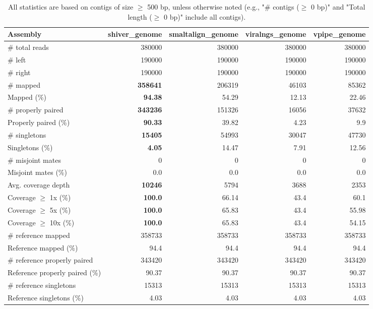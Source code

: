 \documentclass[12pt,a4paper]{article}
\begin{document}
\begin{table}[ht]
\begin{center}
\caption{All statistics are based on contigs of size $\geq$ 500 bp, unless otherwise noted (e.g., "\# contigs ($\geq$ 0 bp)" and "Total length ($\geq$ 0 bp)" include all contigs).}
\begin{tabular}{|l*{4}{|r}|}
\hline
Assembly & shiver\_genome & smaltalign\_genome & viralngs\_genome & vpipe\_genome \\ \hline
\# total reads & 380000 & 380000 & 380000 & 380000 \\ \hline
\# left & 190000 & 190000 & 190000 & 190000 \\ \hline
\# right & 190000 & 190000 & 190000 & 190000 \\ \hline
\# mapped & {\bf 358641} & 206319 & 46103 & 85362 \\ \hline
Mapped (\%) & {\bf 94.38} & 54.29 & 12.13 & 22.46 \\ \hline
\# properly paired & {\bf 343236} & 151326 & 16056 & 37632 \\ \hline
Properly paired (\%) & {\bf 90.33} & 39.82 & 4.23 & 9.9 \\ \hline
\# singletons & {\bf 15405} & 54993 & 30047 & 47730 \\ \hline
Singletons (\%) & {\bf 4.05} & 14.47 & 7.91 & 12.56 \\ \hline
\# misjoint mates & 0 & 0 & 0 & 0 \\ \hline
Misjoint mates (\%) & 0.0 & 0.0 & 0.0 & 0.0 \\ \hline
Avg. coverage depth & {\bf 10246} & 5794 & 3688 & 2353 \\ \hline
Coverage $\geq$ 1x (\%) & {\bf 100.0} & 66.14 & 43.4 & 60.1 \\ \hline
Coverage $\geq$ 5x (\%) & {\bf 100.0} & 65.83 & 43.4 & 55.98 \\ \hline
Coverage $\geq$ 10x (\%) & {\bf 100.0} & 65.83 & 43.4 & 54.15 \\ \hline
\# reference mapped & 358733 & 358733 & 358733 & 358733 \\ \hline
Reference mapped (\%) & 94.4 & 94.4 & 94.4 & 94.4 \\ \hline
\# reference properly paired & 343420 & 343420 & 343420 & 343420 \\ \hline
Reference properly paired (\%) & 90.37 & 90.37 & 90.37 & 90.37 \\ \hline
\# reference singletons & 15313 & 15313 & 15313 & 15313 \\ \hline
Reference singletons (\%) & 4.03 & 4.03 & 4.03 & 4.03 \\ \hline

\end{tabular}
\end{center}
\end{table}
\end{document}
